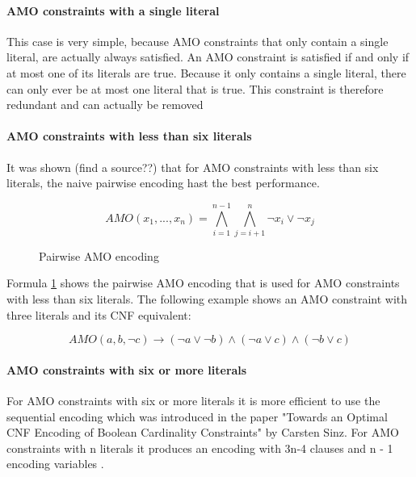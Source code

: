 \paragraph{AMO constraints with a single literal}

This case is very simple, because AMO constraints that only contain a single literal, are actually always satisfied. An AMO constraint is satisfied if and only if at most one of its literals are true. Because it only contains a single literal, there can only ever be at most one literal that is true. This constraint is therefore redundant and can actually be removed

\paragraph{AMO constraints with less than six literals}

It was shown (find a source??) that for AMO constraints with less than six literals, the naive pairwise encoding hast the best performance.

\begin{figure}[h!t]
\label{form:pairwiseAMO}
\centering
\begin{leftbar}
\begin{displaymath}
AMO(x_1,...,x_n) = \bigwedge_{i=1}^{n - 1} \bigwedge_{j=i+1}^{n} \neg x_i \vee \neg x_j
\end{displaymath}
\end{leftbar}
\caption{Pairwise AMO encoding}
\end{figure}

Formula \ref{form:pairwiseAMO} shows the pairwise AMO encoding that is used for AMO constraints with less than six literals. The following example shows an AMO constraint with three literals and its CNF equivalent:

\begin{leftbar}
\begin{displaymath}
AMO(a,b,\neg c) \rightarrow (\neg a \vee \neg b) \wedge (\neg a \vee c) \wedge (\neg b \vee c)
\end{displaymath}
\end{leftbar}

\paragraph{AMO constraints with six or more literals}

For AMO constraints with six or more literals it is more efficient to use the sequential encoding which was introduced in the paper "Towards an Optimal CNF Encoding of
Boolean Cardinality Constraints" \cite{sinz2005towards} by Carsten Sinz. For AMO constraints with n literals it produces an encoding with 3n-4 clauses and n - 1 encoding variables \cite{sinz2005towards}.

